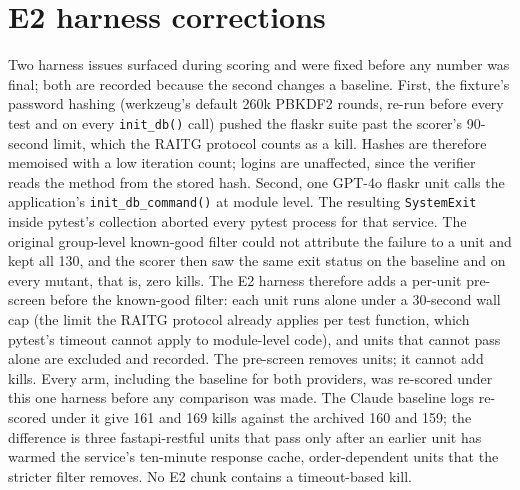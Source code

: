 \documentclass[preprint,12pt]{elsarticle}
\begin{document}
\appendix
\section{E2 harness corrections}
\label{app:harness}
Two harness issues surfaced during scoring and were fixed before any number was final; both are recorded because the second changes a baseline. First, the fixture's password hashing (werkzeug's default 260k PBKDF2 rounds, re-run before every test and on every \texttt{init\_db()} call) pushed the flaskr suite past the scorer's 90-second limit, which the RAITG protocol counts as a kill. Hashes are therefore memoised with a low iteration count; logins are unaffected, since the verifier reads the method from the stored hash. Second, one GPT-4o flaskr unit calls the application's \texttt{init\_db\_command()} at module level. The resulting \texttt{SystemExit} inside pytest's collection aborted every pytest process for that service. The original group-level known-good filter could not attribute the failure to a unit and kept all 130, and the scorer then saw the same exit status on the baseline and on every mutant, that is, zero kills. The E2 harness therefore adds a per-unit pre-screen before the known-good filter: each unit runs alone under a 30-second wall cap (the limit the RAITG protocol already applies per test function, which pytest's timeout cannot apply to module-level code), and units that cannot pass alone are excluded and recorded. The pre-screen removes units; it cannot add kills. Every arm, including the baseline for both providers, was re-scored under this one harness before any comparison was made. The Claude baseline logs re-scored under it give 161 and 169 kills against the archived 160 and 159; the difference is three fastapi-restful units that pass only after an earlier unit has warmed the service's ten-minute response cache, order-dependent units that the stricter filter removes. No E2 chunk contains a timeout-based kill.



\end{document}
